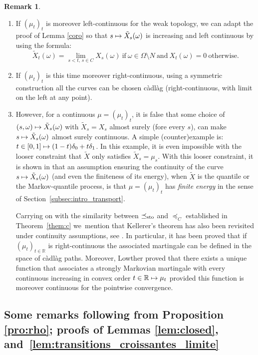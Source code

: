 \documentclass[11pt]{article}
\newcommand{\Subsection}{\subsection}
\newcommand{\skpt}{\smallskip}
\newcommand\mto{\mathchoice{\longmapsto}{\mapsto}{\mapsto}{\mapsto}}
\theoremstyle{plain}
\theoremstyle{definition}
\newtheorem{rem}[them]{Remark}
\newcommand{\R}{\mathbb{R}}
\newcommand{\leqc}{\preceq_{C}}
\newcommand{\leqs}{\preceq_{\text{\rm sto}}}
\begin{document}
\skpt
\begin{rem}
\begin{enumerate}
\item
If $(\mu_t)_t$ is moreover left-continuous for the weak topology, we can adapt the proof of Lemma \ref{coro} so that $s\mto \tilde X_s(\omega)$ is increasing and left continuous by using the formula:\vspace*{-3pt}
\[\tilde X_t(\omega)=\lim_{s<t,\,s\in C}X_s(\omega)\ \text{if}\ \omega \in \Omega\setminus N\ \text{and}\ X_t(\omega)=0\ \text{otherwise}.\]

\item
If $(\mu_t)_t$ is this time moreover right-continuous, using a symmetric construction all the curves can be chosen càdlàg (right-continuous, with limit on the left at any point).

\item
However, for a continuous $\mu=(\mu_t)_t$, it is false that some choice of $(s,\omega)\mto \tilde X_s(\omega)$ with $\tilde X_s=X_s$ almost surely (fore every $s$), can make $s\mto \tilde X_s(\omega)$ almost surely continuous. A simple (counter)example is: $t\in [0,1]\mto (1-t)\delta_0+t \delta_1$. In this example, it is even impossible with the looser constraint that $\tilde X$ only satisfies $\tilde X_s=\mu_s$. With this looser constraint, it is shown in \cite{BouJui2} that an assumption ensuring the continuity of the curve $s\mto \tilde X_s(\omega)$ (and even the finiteness of its energy), when $\tilde X$ is the quantile or the Markov-quantile process, is that $\mu=(\mu_t)_t$ has \emph{finite energy} in the sense of Section~\ref{subsec:intro_transport}.

Carrying on with the similarity between $\leqs$ and $\leqc$ established in Theorem~\ref{them:c} we~mention that Kellerer's theorem has also been revisited under continuity assumptions, see \cite{Low,HiRoYo14,BHS}. In particular, it has been proved that if $(\mu_t)_{t\in \R}$ is right-continuous the associated martingale can be defined in the space of càdlàg paths. Moreover, Lowther proved \cite[Th.\,1.5]{Low2} that there exists a unique function that associates a strongly Markovian martingale with every continuous increasing in convex order $t\in \R\mto \mu_t$ provided this function is moreover continuous for the pointwise convergence.
\end{enumerate}
\end{rem}

\Subsection{Some remarks following from Proposition \ref{pro:rho}; proofs of Lemmas \ref{lem:closed}, and~\ref{lem:transitions_croissantes_limite}}\label{subsec:proof_lemmas}
\end{document}
